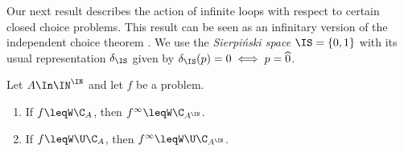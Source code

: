 \documentclass{lmcs}
\begin{document}
Our next result describes the action of infinite loops with respect to certain closed choice problems.
This result can be seen as an infinitary version of the independent choice theorem \cite[Theorem~7.2]{BBP12}.
We use the {\em Sierpi\'nski space} $\IS=\{0,1\}$ with its usual representation $\delta_\IS$ given by
$\delta_\IS(p)=0\iff p=\widehat{0}$.

\begin{thm}
\label{thm:independent}
Let $A\In\IN^\IN$ and let $f$ be a problem.
\begin{enumerate}
\item If $f\leqW\C_A$, then $f^\infty\leqW\C_{A^\IN}$.
\item If $f\leqW\U\C_A$, then $f^\infty\leqW\U\C_{A^\IN}$.
\end{enumerate}
\end{thm}
\end{document}
